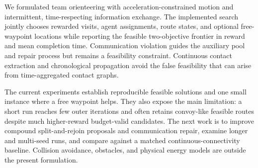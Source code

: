 We formulated team orienteering with acceleration-constrained motion and intermittent, time-respecting information exchange. The implemented search jointly chooses rewarded visits, agent assignments, route states, and optional free-waypoint locations while reporting the feasible two-objective frontier in reward and mean completion time. Communication violation guides the auxiliary pool and repair process but remains a feasibility constraint. Continuous contact extraction and chronological propagation avoid the false feasibility that can arise from time-aggregated contact graphs.

The current experiments establish reproducible feasible solutions and one small instance where a free waypoint helps. They also expose the main limitation: a short run reaches few outer iterations and often retains convoy-like feasible routes despite much higher-reward budget-valid candidates. The next work is to improve compound split-and-rejoin proposals and communication repair, examine longer and multi-seed runs, and compare against a matched continuous-connectivity baseline. Collision avoidance, obstacles, and physical energy models are outside the present formulation.
